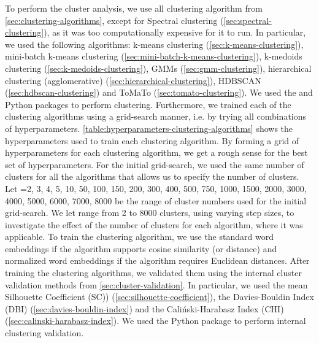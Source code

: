 To perform the cluster analysis, we use all clustering algorithm from \cref{sec:clustering-algorithms}, except for Spectral clustering (\cref{sec:spectral-clustering}), as it was too computationally expensive for it to run. In particular, we used the following algorithms: k-means clustering (\cref{sec:k-means-clustering}), mini-batch k-means clustering (\cref{sec:mini-batch-k-means-clustering}), k-medoids clustering (\cref{sec:k-medoids-clustering}), GMMs (\cref{sec:gmm-clustering}), hierarchical clustering (agglomerative) (\cref{sec:hierarchical-clustering}), HDBSCAN (\cref{sec:hdbscan-clustering}) and ToMaTo (\cref{sec:tomato-clustering}). We used the  \cite{ScikitLearn2011} and  \cite{mcinnes2017hdbscan} Python packages to perform clustering. Furthermore, we trained each of the clustering algorithms using a grid-search manner, i.e. by trying all combinations of hyperparameters. \cref{table:hyperparameters-clustering-algorithms} shows the hyperparameters used to train each clustering algorithm. By forming a grid of hyperparameters for each clustering algorithm, we get a rough sense for the best set of hyperparameters. For the initial grid-search, we used the same number of clusters for all the algorithms that allows us to specify the number of clusters. Let =2, 3, 4, 5, 10, 50, 100, 150, 200, 300, 400, 500, 750, 1000, 1500, 2000, 3000, 4000, 5000, 6000, 7000, 8000 be the range of cluster numbers used for the initial grid-search. We let  range from 2 to 8000 clusters, using varying step sizes, to investigate the effect of the number of clusters for each algorithm, where it was applicable. To train the clustering algorithm, we use the standard word embeddings if the algorithm supports cosine similarity (or distance) and normalized word embeddings if the algorithm requires Euclidean distances. After training the clustering algorithms, we validated them using the internal cluster validation methods from \cref{sec:cluster-validation}. In particular, we used the mean Silhouette Coefficient (SC)) (\cref{sec:silhouette-coefficient}), the Davies-Bouldin Index (DBI) (\cref{sec:davies-bouldin-index}) and the Caliński-Harabasz Index (CHI) (\cref{sec:calinski-harabasz-index}). We used the  Python package to perform internal clustering validation.
